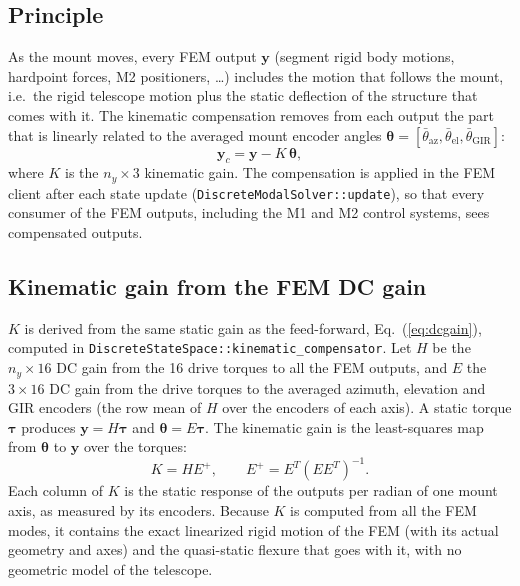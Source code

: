 \documentclass{gmto}
\numberwithin{table}{section}
\numberwithin{equation}{section}
\newcommand{\code}[1]{\texttt{#1}}
\newcommand{\vect}[1]{\boldsymbol{#1}}
\begin{document}
\subsection{Principle}
\label{sec:kin-principle}

As the mount moves, every FEM output $\vect{y}$ (segment rigid body motions, hardpoint forces,
M2 positioners, \ldots) includes the motion that follows the mount, i.e.\ the rigid telescope motion
plus the static deflection of the structure that comes with it. The kinematic compensation removes
from each output the part that is linearly related to the averaged mount encoder angles
$\vect{\theta} = [\bar\theta_{\mathrm{az}}, \bar\theta_{\mathrm{el}}, \bar\theta_{\mathrm{GIR}}]$:
\begin{equation}
  \vect{y}_c = \vect{y} - K\,\vect{\theta},
  \label{eq:kin}
\end{equation}
where $K$ is the $n_y\times 3$ kinematic gain.
The compensation is applied in the FEM client after each state update
(\code{DiscreteModalSolver::update}), so that every consumer of the FEM outputs, including the M1 and
M2 control systems, sees compensated outputs.

\subsection{Kinematic gain from the FEM DC gain}
\label{sec:kin-gain}

$K$ is derived from the same static gain as the feed-forward, Eq.~(\ref{eq:dcgain}), computed in
\code{DiscreteStateSpace::kinematic\_compensator}.
Let $H$ be the $n_y\times 16$ DC gain from the 16 drive torques to all the FEM outputs, and $E$ the
$3\times 16$ DC gain from the drive torques to the averaged azimuth, elevation and GIR encoders (the
row mean of $H$ over the encoders of each axis). A static torque $\vect{\tau}$ produces
$\vect{y} = H\vect{\tau}$ and $\vect{\theta} = E\vect{\tau}$. The kinematic gain is the
least-squares map from $\vect{\theta}$ to $\vect{y}$ over the torques:
\begin{equation}
  K = H E^{+}, \qquad E^{+} = E^{T}\left(E E^{T}\right)^{-1}.
  \label{eq:kgain}
\end{equation}
Each column of $K$ is the static response of the outputs per radian of one mount axis, as measured
by its encoders. Because $K$ is computed from all the FEM modes, it contains the exact linearized
rigid motion of the FEM (with its actual geometry and axes) and the quasi-static flexure that goes
with it, with no geometric model of the telescope.
\end{document}
